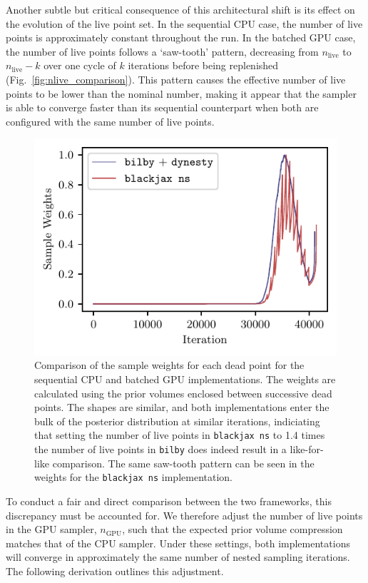 \documentclass[fleqn,usenatbib]{mnras}
\begin{document}
Another subtle but critical consequence of this architectural shift is
its effect on the evolution of the live point set. In the sequential
CPU case, the number of live points is approximately constant throughout the run. In the
batched GPU case, the number of live points follows a `saw-tooth'
pattern, decreasing from $n_{\text{live}}$ to
$n_{\text{live}} - k$ over one cycle of $k$ iterations before being replenished (Fig.~\ref{fig:nlive_comparison}). This pattern
causes the effective number of live points to be lower than the nominal number,
making it appear that the sampler is able to converge faster than its sequential counterpart
when both are configured with the same number of live points.

\begin{figure}
    \centering
    \includegraphics{figures/weights_comparison.pdf}
    \caption{Comparison of the sample weights for each dead point for the sequential CPU and batched GPU implementations.
    The weights are calculated using the prior volumes enclosed between successive dead points. 
    The shapes are similar, and both implementations enter the bulk of the posterior distribution at similar iterations,
    indiciating that setting the number of live points in \texttt{blackjax ns} to 1.4 times the number of live points in \texttt{bilby} 
    does indeed result in a like-for-like comparison. The same saw-tooth pattern can be 
    seen in the weights for the \texttt{blackjax ns} implementation.}
    \label{fig:weights_comparison}
\end{figure}

To conduct a fair and direct comparison between the two frameworks, this
discrepancy must be accounted for. We therefore adjust the number of
live points in the GPU sampler, $n_{\text{GPU}}$, such that the
expected prior volume compression matches that of the CPU sampler. 
Under these settings, both implementations will converge in
approximately the same number of nested sampling iterations. 
The following derivation outlines this adjustment.
\end{document}

